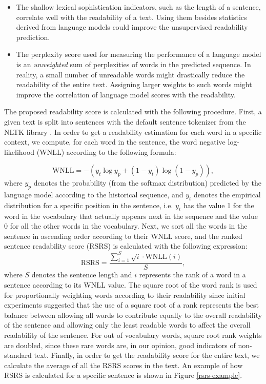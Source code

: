 \documentclass{clv3}
\begin{document}
\begin{itemize}
\item The shallow lexical sophistication indicators, such as the length of a sentence, correlate well with the readability of a text. Using them besides statistics derived from language models could improve the unsupervised readability prediction. 
\item The perplexity score used for measuring the performance of a language model is an \emph{unweighted} sum of perplexities of words in the predicted sequence. In reality, a small number of unreadable words might drastically reduce the readability of the entire text. Assigning larger weights to such words might improve the correlation of language model scores with the readability.
\end{itemize}

The proposed readability score is calculated with the following procedure. First, a given text is split into sentences with the default sentence tokenizer from the NLTK library \citep{bird2004nltk}. In order to get a readability estimation for each word in a specific context, we compute, for each word in the sentence, the word negative log-likelihood (WNLL) according to the following formula:

\[\textrm{WNLL}= -(y_t \log{y_p} + (1 - y_t) \log{(1 - y_p)}),\]
\noindent
where $y_p$ denotes the probability (from the softmax distribution) predicted by the language model according to the historical sequence, and $y_t$ denotes the empirical distribution for a specific position in the sentence, i.e. $y_t$ has the value 1 for the word in the vocabulary that actually appears next in the sequence and the value 0 for all the other words in the vocabulary. Next, we sort all the words in the sentence in ascending order according to their WNLL score, and the ranked sentence readability score (RSRS) is calculated with the following expression:
\begin{equation}
 \textrm{RSRS} = \frac{\sum_{i = 1}^{S} \sqrt{i} \cdot \textrm{WNLL}(i)}{S},
 \label{eq:RSRS}
\end{equation}
\noindent
where $S$ denotes the sentence length and $i$ represents the rank of a word in a sentence according to its WNLL value. The square root of the word rank is used for proportionally weighting words according to their readability since initial experiments suggested that the use of a square root of a rank represents the best balance between allowing all words to contribute equally to the overall readability of the sentence and allowing only the least readable words to affect the overall readability of the sentence. For out of vocabulary words, square root rank weights are doubled, since these rare words are, in our opinion, good indicators of non-standard text. Finally, in order to get the readability score for the entire text, we calculate the average of all the RSRS scores in the text. An example of how RSRS is calculated for a specific sentence is shown in Figure \ref{rsrs-example}. 
\end{document}
